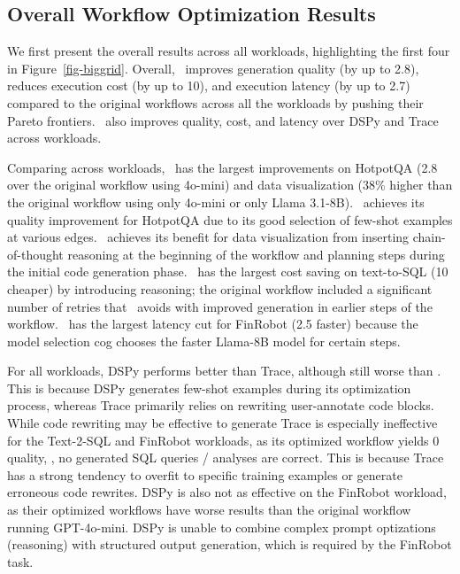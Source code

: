\subsection{Overall Workflow Optimization Results}

We first present the overall results across all workloads, highlighting the first four in Figure~\ref{fig-biggrid}.
Overall, \sysname\ improves generation quality (by up to 2.8\x{}), reduces execution cost (by up to 10\x{}), and execution latency (by up to 2.7\x{}) compared to the original workflows across all the workloads by pushing their Pareto frontiers. 
\sysname\ also improves quality, cost, and latency over DSPy and Trace across workloads.

Comparing across workloads, \sysname\ has the largest improvements on HotpotQA (2.8\x{} over the original workflow using 4o-mini) and data visualization (38\% higher than the original workflow using only 4o-mini or only Llama 3.1-8B). \sysname\ achieves its quality improvement for HotpotQA due to its good selection of few-shot examples at various edges. \sysname\ achieves its benefit for data visualization from inserting chain-of-thought reasoning at the beginning of the workflow and planning steps during the initial code generation phase. %
\sysname\ has the largest cost saving on text-to-SQL (10\x{} cheaper) by introducing reasoning; the original workflow included a significant number of retries that \sysname\ avoids with improved generation in earlier steps of the workflow. \sysname\ has the largest latency cut for FinRobot (2.5\x{} faster) because the model selection cog chooses the faster Llama-8B model for certain steps. 


For all workloads, DSPy performs better than Trace, although still worse than \sysname. This is because DSPy generates few-shot examples during its optimization process, whereas Trace primarily relies on rewriting user-annotate code blocks. While code rewriting may be effective to generate Trace is especially ineffective for the Text-2-SQL and FinRobot workloads, as its optimized workflow yields 0 quality, \ie, no generated SQL queries / analyses are correct. This is because Trace has a strong tendency to overfit to specific training examples or generate erroneous code rewrites.
DSPy is also not as effective on the FinRobot workload, as their optimized workflows have worse results than the original workflow running GPT-4o-mini. DSPy is unable to combine complex prompt optizations (\eg reasoning) with structured output generation, which is required by the FinRobot task.  

